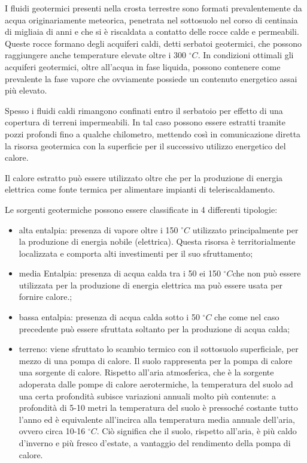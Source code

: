 \documentclass[laurea,oneside,11pt]{USiena_tesiLM3}
\begin{document}
I fluidi geotermici presenti nella crosta terrestre sono formati prevalentemente da acqua originariamente meteorica, penetrata nel sottosuolo nel corso di centinaia di migliaia di anni e che si è riscaldata a contatto delle rocce calde e permeabili. Queste rocce formano degli acquiferi caldi, detti serbatoi geotermici, che possono raggiungere anche temperature elevate oltre i 300 $^{\circ}C$. In condizioni ottimali gli acquiferi geotermici, oltre all'acqua in fase liquida, possono contenere come prevalente la fase vapore che ovviamente possiede un contenuto energetico assai più elevato.

Spesso i fluidi caldi rimangono confinati entro il serbatoio per effetto di una copertura di terreni impermeabili. In tal caso possono essere estratti tramite pozzi profondi fino a qualche chilometro, mettendo così in comunicazione diretta la risorsa geotermica con la superficie per il successivo utilizzo energetico del calore. 

Il calore estratto può essere utilizzato oltre che per la produzione di energia elettrica come fonte termica per alimentare impianti di teleriscaldamento.

Le sorgenti geotermiche possono essere classificate in 4 differenti tipologie:
\begin{itemize}
\item alta entalpia: presenza di vapore oltre i 150 $^{\circ}C$ utilizzato principalmente per la produzione di energia nobile (elettrica). Questa risorsa è territorialmente localizzata e comporta alti investimenti per il suo sfruttamento;
\item media Entalpia: presenza di acqua calda tra i 50 ei 150 $^{\circ}C$che non può essere utilizzata per la produzione di energia elettrica ma può essere usata per fornire calore.;
\item bassa entalpia: presenza di acqua calda sotto i 50 $^{\circ}C$ che come nel caso precedente può essere sfruttata soltanto per la produzione di acqua calda;
\item terreno: viene sfruttato lo scambio termico con il sottosuolo superficiale, per mezzo di una pompa di calore. Il suolo rappresenta per la pompa di calore una sorgente di calore. Rispetto all'aria atmosferica, che è la sorgente adoperata dalle pompe di calore aerotermiche, la temperatura del suolo ad una certa profondità subisce variazioni annuali molto più contenute: a profondità di 5-10 metri la temperatura del suolo è pressoché costante tutto l'anno ed è equivalente all'incirca alla temperatura media annuale dell'aria, ovvero circa 10-16 $^{\circ}C$. Ciò significa che il suolo, rispetto all'aria, è più caldo d'inverno e più fresco d'estate, a vantaggio del rendimento della pompa di calore.
\end{itemize}
\end{document}
